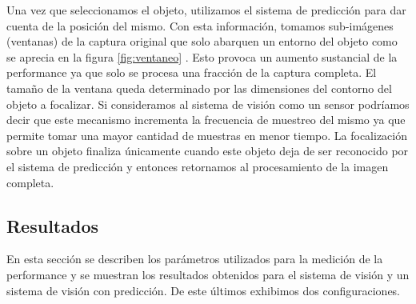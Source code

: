 	\indent Una vez que seleccionamos el objeto, utilizamos el sistema de predicción para dar cuenta de la posición del mismo. Con esta información, tomamos sub-imágenes (ventanas) de la captura original que solo abarquen un entorno del objeto como se aprecia en la figura \ref{fig:ventaneo} . Esto provoca un aumento sustancial de la performance ya que solo se procesa una fracción de la captura completa. El tamaño de la ventana queda determinado por las dimensiones del contorno del objeto a focalizar. Si consideramos al sistema de visión como un sensor podríamos decir que este mecanismo incrementa la frecuencia de muestreo del mismo ya que permite tomar una mayor cantidad de muestras en menor tiempo. La focalización sobre un objeto finaliza únicamente cuando este objeto deja de ser reconocido por el sistema de predicción y entonces retornamos al  procesamiento de la imagen completa. 


	
	
\subsection{Resultados}
En esta sección se describen los parámetros utilizados para la 
medición de la performance y se muestran los resultados obtenidos para 
el sistema de visión y un sistema de visión con predicción. De este 
últimos exhibimos dos configuraciones.


